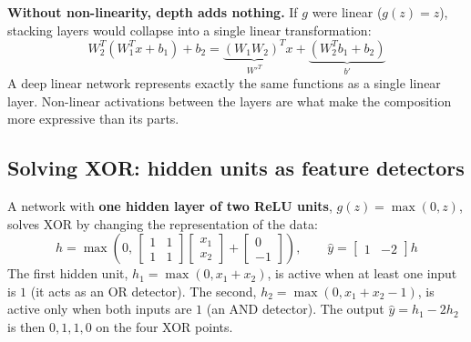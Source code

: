 \begin{note}
    \textbf{Without non-linearity, depth adds nothing.} If $g$ were linear
    ($g(z) = z$), stacking layers would collapse into a single linear
    transformation:
    \begin{equation*}
        W_2^T(W_1^T x + b_1) + b_2 = \underbrace{(W_1 W_2)^T}_{W'^T} x + \underbrace{(W_2^T b_1 + b_2)}_{b'}
    \end{equation*}
    A deep linear network represents exactly the same functions as a single linear
    layer. Non-linear activations between the layers are what make the composition
    more expressive than its parts.
\end{note}

\subsection{Solving XOR: hidden units as feature detectors}
A network with \textbf{one hidden layer of two ReLU units}, $g(z) = \max(0, z)$,
solves XOR by changing the representation of the data:
\begin{equation*}
    h = \max\left(0, \, \begin{bmatrix} 1 & 1 \\ 1 & 1 \end{bmatrix} \begin{bmatrix} x_1 \\ x_2 \end{bmatrix} + \begin{bmatrix} 0 \\ -1 \end{bmatrix}\right), \qquad
    \hat{y} = \begin{bmatrix} 1 & -2 \end{bmatrix} h
\end{equation*}
The first hidden unit, $h_1 = \max(0, x_1 + x_2)$, is active when at least one
input is $1$ (it acts as an OR detector). The second, $h_2 = \max(0, x_1 + x_2 - 1)$,
is active only when both inputs are $1$ (an AND detector). The output
$\hat{y} = h_1 - 2h_2$ is then $0, 1, 1, 0$ on the four XOR points.

